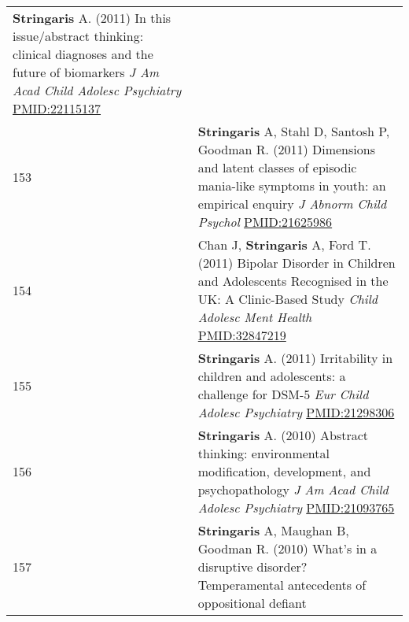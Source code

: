 \documentclass[
]{article}
\begin{document}
\begin{longtable}[]{@{}ll@{}}
\begin{minipage}[t]{0.94\columnwidth}
\textbf{Stringaris} A. (2011) In this issue/abstract thinking: clinical
diagnoses and the future of biomarkers \emph{J Am Acad Child Adolesc
Psychiatry} \url{PMID:22115137}\strut
\end{minipage}\tabularnewline
\begin{minipage}[t]{0.01\columnwidth}\raggedright
153\strut
\end{minipage} & \begin{minipage}[t]{0.94\columnwidth}\raggedright
\textbf{Stringaris} A, Stahl D, Santosh P, Goodman R. (2011) Dimensions
and latent classes of episodic mania-like symptoms in youth: an
empirical enquiry \emph{J Abnorm Child Psychol}
\url{PMID:21625986}\strut
\end{minipage}\tabularnewline
\begin{minipage}[t]{0.01\columnwidth}\raggedright
154\strut
\end{minipage} & \begin{minipage}[t]{0.94\columnwidth}\raggedright
Chan J, \textbf{Stringaris} A, Ford T. (2011) Bipolar Disorder in
Children and Adolescents Recognised in the UK: A Clinic-Based Study
\emph{Child Adolesc Ment Health} \url{PMID:32847219}\strut
\end{minipage}\tabularnewline
\begin{minipage}[t]{0.01\columnwidth}\raggedright
155\strut
\end{minipage} & \begin{minipage}[t]{0.94\columnwidth}\raggedright
\textbf{Stringaris} A. (2011) Irritability in children and adolescents:
a challenge for DSM-5 \emph{Eur Child Adolesc Psychiatry}
\url{PMID:21298306}\strut
\end{minipage}\tabularnewline
\begin{minipage}[t]{0.01\columnwidth}\raggedright
156\strut
\end{minipage} & \begin{minipage}[t]{0.94\columnwidth}\raggedright
\textbf{Stringaris} A. (2010) Abstract thinking: environmental
modification, development, and psychopathology \emph{J Am Acad Child
Adolesc Psychiatry} \url{PMID:21093765}\strut
\end{minipage}\tabularnewline
\begin{minipage}[t]{0.01\columnwidth}\raggedright
157\strut
\end{minipage} & \begin{minipage}[t]{0.94\columnwidth}\raggedright
\textbf{Stringaris} A, Maughan B, Goodman R. (2010) What's in a
disruptive disorder? Temperamental antecedents of oppositional defiant

\end{minipage}
\end{longtable}
\end{document}
